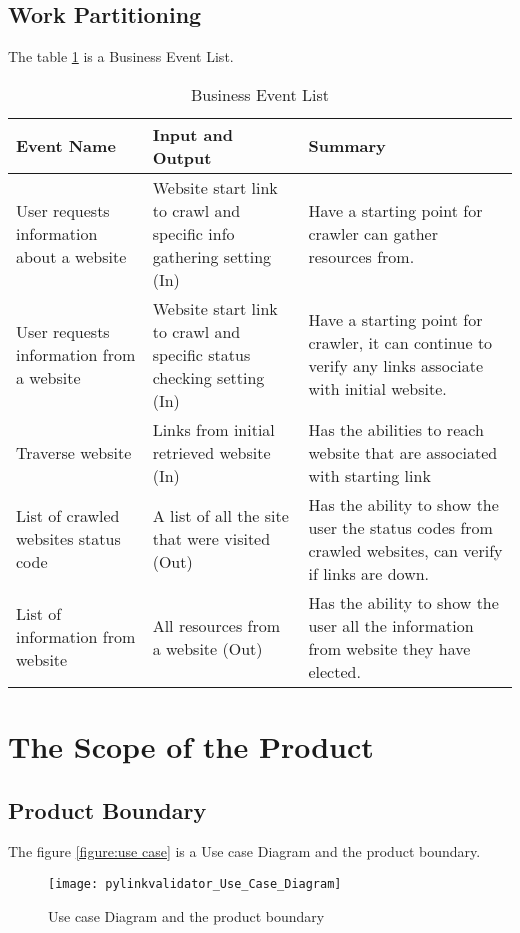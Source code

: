 \documentclass[titlepage]{article}
\begin{document}
\subsection*{Work Partitioning}
The table \ref{table:Business Event List} is a Business Event List.

\begin{table}[h!]
    \begin{tabular}{| p{5cm} | p{5cm} | p{5cm} |}    \hline
    Event Name &	Input and Output	 & Summary\\ \hline
    User requests information about a website	& Website start link to crawl and specific info gathering setting (In)	& Have a starting point for crawler can gather resources from. \\ \hline
    User requests information from a website	 & Website start link to crawl and specific status checking setting (In)	& Have a starting point for crawler, it can continue to verify any links associate with initial website.\\ \hline
    Traverse website	& Links from initial retrieved website (In)	& Has the abilities to reach website that are associated with starting link \\ \hline
    
    List of crawled websites status code & 	A list of all the site that were visited (Out)	& Has the ability to show the user the status codes from crawled websites, can verify if links are down. \\ \hline
     
      List of information from website	& All resources from a website (Out)	& Has the ability to show the user all the information from website they have elected. \\ \hline
      
    \end{tabular}
    \caption{Business Event List}
\label{table:Business Event List}
\end{table}


\section{The Scope of the Product}
\subsection*{Product Boundary}
The figure \ref{figure:use case} is a Use case Diagram and the product boundary.
\begin{figure}[h!]
  \caption{Use case Diagram and the product boundary}
  \centering
    \texttt{[image: pylinkvalidator\_Use\_Case\_Diagram]}
\end{figure}
\label{figure:use case}
\end{document}
